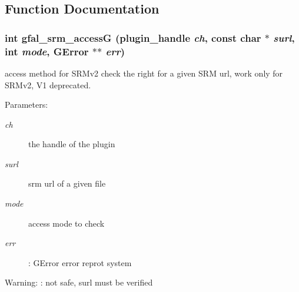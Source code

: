 \subsection{Function Documentation}
\subsubsection{\setlength{\rightskip}{0pt plus 5cm}int gfal\_\-srm\_\-access\-G (plugin\_\-handle {\em ch}, const char $\ast$ {\em surl}, int {\em mode}, GError $\ast$$\ast$ {\em err})}\label{gfal__common__srm__access_8h_c2aa3066438a3019a5bf6ae721c70a8e}


access method for SRMv2 check the right for a given SRM url, work only for SRMv2, V1 deprecated. 

\begin{Desc}
\item[Parameters:]
\begin{description}
\item[{\em ch}]the handle of the plugin \item[{\em surl}]srm url of a given file \item[{\em mode}]access mode to check \item[{\em err}]: GError error reprot system \end{description}
\end{Desc}
\begin{Desc}
\item[Warning:]: not safe, surl must be verified \end{Desc}
